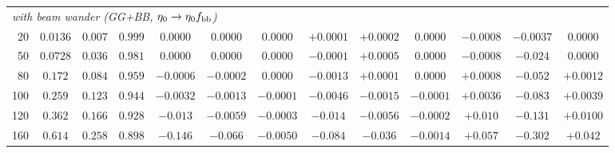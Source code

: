 \begin{table}[htbp]
\begin{tabular}{rcccccccccccc}
\midrule
\multicolumn{13}{l}{\emph{with beam wander (GG+BB, $\eta_0\to\eta_0f_{\rm bb}$)}} \\
20 & $0.0136$ & $0.007$ & $0.999$ & $0.0000$ & $0.0000$ & $0.0000$ & $+0.0001$ & $+0.0002$ & $0.0000$ & $-0.0008$ & $-0.0037$ & $0.0000$ \\
50 & $0.0728$ & $0.036$ & $0.981$ & $0.0000$ & $0.0000$ & $0.0000$ & $-0.0001$ & $+0.0005$ & $0.0000$ & $-0.0008$ & $-0.024$ & $0.0000$ \\
80 & $0.172$ & $0.084$ & $0.959$ & $-0.0006$ & $-0.0002$ & $0.0000$ & $-0.0013$ & $+0.0001$ & $0.0000$ & $+0.0008$ & $-0.052$ & $+0.0012$ \\
100 & $0.259$ & $0.123$ & $0.944$ & $-0.0032$ & $-0.0013$ & $-0.0001$ & $-0.0046$ & $-0.0015$ & $-0.0001$ & $+0.0036$ & $-0.083$ & $+0.0039$ \\
120 & $0.362$ & $0.166$ & $0.928$ & $-0.013$ & $-0.0059$ & $-0.0003$ & $-0.014$ & $-0.0056$ & $-0.0002$ & $+0.010$ & $-0.131$ & $+0.0100$ \\
160 & $0.614$ & $0.258$ & $0.898$ & $-0.146$ & $-0.066$ & $-0.0050$ & $-0.084$ & $-0.036$ & $-0.0014$ & $+0.057$ & $-0.302$ & $+0.042$ \\

\bottomrule
\end{tabular}
\end{table}

